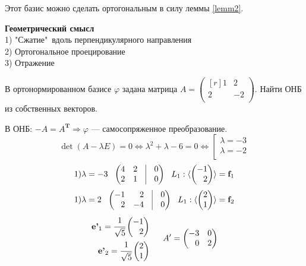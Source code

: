Этот базис можно сделать ортогональным в силу леммы \ref{lemm2}.

\textbf{Геометрический смысл}\\
1) "Сжатие"\ вдоль перпендикулярного направления\\
2) Ортогональное проецирование\\
3) Отражение
\begin{prim}
В ортонормированном базисе $\varphi$ задана матрица $ A=
\left(
\begin{matrix*}[r]
1 & 2\\ 
2 & -2\\
\end{matrix*}
\right). 
$
Найти ОНБ из собственных векторов.
\end{prim}
В ОНБ: $-A=A^{\textbf{T}} \Rightarrow \varphi$ --- самосопряженное преобразование.\\
$$
\det (A-\lambda E)=0 \Leftrightarrow \lambda^2 +\lambda -6=0  \Leftrightarrow
\left[
\begin{aligned}
\lambda=-3\\
\lambda=-2\\
\end{aligned}
\right.
$$
$$
1) \lambda=-3 \:\:\: 
\begin{pmatrix*}[r]
 4 & 2 & \vrule & 0\\
 2 & 1 & \vrule & 0\\
\end{pmatrix*}
\:\:\:  
L_1:
 \langle \left(
\begin{matrix*}[r]
-1\\ 2\\ 
\end{matrix*}
\right) \rangle
=\textbf{f}_1
$$
$$
1) \lambda=2 \:\:\: 
\begin{pmatrix*}[r]
 -1 & 2 & \vrule & 0\\
 2 & -4 & \vrule & 0\\
\end{pmatrix*}
\:\:\:  
L_1:
 \langle \left(
\begin{matrix*}[r]
2\\ 1\\ 
\end{matrix*}
\right) \rangle
=\textbf{f}_2
$$
$$
\left.
\begin{aligned}
\textbf{e'}_1 =\cfrac{1}{\sqrt{5}}
\begin{pmatrix*}[r]
-1\\ 2\\ 
\end{pmatrix*}
 \\
\textbf{e'}_2 =\cfrac{1}{\sqrt{5}}
\begin{pmatrix*}[r]
2\\ 1\\ 
\end{pmatrix*}
 \\
\end{aligned}
\right.
 \:\:\:\:\:\: A'=
\begin{pmatrix*}[r]
 -3 & 0 \\
 0 & 2 \\
\end{pmatrix*}
$$
